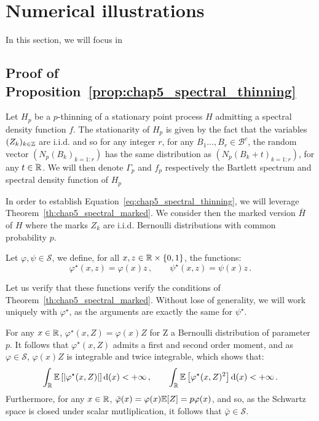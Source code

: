 \section{Numerical illustrations}
    In this section, we will focus in 


\begin{subappendices}
    \section{Proof of Proposition~\ref{prop:chap5_spectral_thinning}}\label{appendix:chap5_proof_spectral_thinning}
        Let $H_p$ be a $p$-thinning of a stationary point process $H$ admitting a spectral density function $f$.
        The stationarity of $H_p$ is given by the fact that the variables $(Z_k)_{k\in{\mathbb Z}}$ are i.i.d. and so for any integer $r$, 
        for any $B_1\ldots, B_r \in\mathcal{B}^c$, 
        the random vector $(N_p(B_k)_{k=1:r})$ has the same distribution as $(N_p(B_k+t)_{k=1:r})$,
        for any $t\in{\mathbb R}$.
        We will then denote $\Gamma_p$ and $f_p$ respectively the Bartlett spectrum and spectral density function of $H_p$

        In order to establish Equation~\eqref{eq:chap5_spectral_thinning}, we will leverage Theorem~\ref{th:chap5_spectral_marked}.
        We consider then the marked version $\bar H$ of $H$ where the marks $Z_k$ are i.i.d. Bernoulli distributions with common probability $p$.

        Let $\varphi, \psi \in \mathcal{S}$, we define, for all $x,z\in{\mathbb R}\times\{0,1\}$, the functions:
        \[\varphi^\star(x,z) = \varphi(x)z\,,\qquad \psi^\star(x,z) = \psi(x)z\,.\]

        Let us verify that these functions verify the conditions of Theorem~\ref{th:chap5_spectral_marked}. 
        Without lose of generality, we will work uniquely with $\varphi^\star$, as the arguments are exactly the same for $\psi^\star$.
        
        For any $x\in{\mathbb R}$, $\varphi^\star(x, Z) = \varphi(x)Z$ for Z a Bernoulli distribution of parameter $p$.
        It follows that $\varphi^\star(x, Z)$ admits a first and second order moment, and as $\varphi\in\mathcal{S}$, 
        $\varphi(x)Z$ is integrable and twice integrable, which shows that:
                \[
                \int_{{\mathbb R}}{{\mathbb E}\left[|\varphi^\star(x, Z)|\right]{\mathrm{d}}(x)} < +\infty\,,\qquad 
                \int_{{\mathbb R}}{{\mathbb E}\left[\varphi^\star(x, Z)^2\right]{\mathrm{d}}(x)} < +\infty\,.
                \]
        Furthermore, for any $x\in{\mathbb R}$, $\bar \varphi(x) = \varphi(x){\mathbb E}[Z] = p \varphi(x)$,
        and so, as the Schwartz space is closed under scalar mutliplication, it follows that $\bar \varphi\in\mathcal{S}$.


\end{subappendices}
